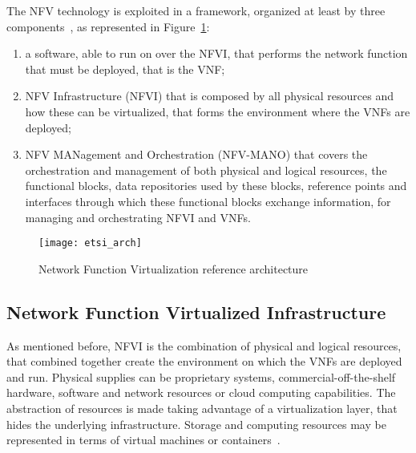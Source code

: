 The NFV technology is exploited in a framework, organized
at least by three components~\cite{etsi2013gs}, as represented in
Figure~\ref{chap:background:img:etsi_arch}:
\begin{enumerate}
  \item a software, able to run on over the NFVI, that performs the network
  function that must be deployed, that is the VNF;
  \item NFV Infrastructure (NFVI) that is composed by all physical resources
  and how these can be virtualized, that forms the environment where the VNFs
  are deployed;
  \item NFV MANagement and Orchestration (NFV-MANO) that covers the
  orchestration and management of both physical and logical resources, the
  functional blocks, data repositories used by these blocks, reference points
  and interfaces through which these functional blocks exchange
  information, for managing and orchestrating NFVI and VNFs.
\end{enumerate}

\begin{figure}
  \centering
  \texttt{[image: etsi\_arch]}
  \caption[Network Function Virtualization reference architecture]{Network
    Function Virtualization reference architecture~\cite{etsi2013gs}}
  \label{chap:background:img:etsi_arch}
\end{figure}

\subsection{Network Function Virtualized Infrastructure}
As mentioned before, NFVI is the combination of physical and logical resources,
that combined together create the environment on which the VNFs are deployed
and run. Physical supplies can be proprietary systems, commercial-off-the-shelf
hardware, software and network resources or cloud computing capabilities. The
abstraction of resources is made taking advantage of a virtualization layer,
that hides the underlying infrastructure. Storage and computing resources may
be represented in terms of virtual machines or
containers~\cite{mijumbi2016network}.

